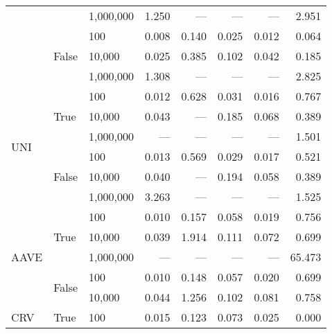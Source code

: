 \begin{tabular}{lllrrrrr}
                          &                        & 1,000,000       & 1.250   & ---    & ---   & ---   & 2.951   \\
    \cline{2-8}
                          & \multirow{3}{*}{False} & 100             & 0.008   & 0.140  & 0.025 & 0.012 & 0.064   \\
                          &                        & 10,000          & 0.025   & 0.385  & 0.102 & 0.042 & 0.185   \\
                          &                        & 1,000,000       & 1.308   & ---    & ---   & ---   & 2.825   \\
    \cline{1-8}
    \cline{2-8}
    \multirow{6}{*}{UNI}  & \multirow{3}{*}{True}  & 100             & 0.012   & 0.628  & 0.031 & 0.016 & 0.767   \\
                          &                        & 10,000          & 0.043   & ---    & 0.185 & 0.068 & 0.389   \\
                          &                        & 1,000,000       & ---     & ---    & ---   & ---   & 1.501   \\
    \cline{2-8}
                          & \multirow{3}{*}{False} & 100             & 0.013   & 0.569  & 0.029 & 0.017 & 0.521   \\
                          &                        & 10,000          & 0.040   & ---    & 0.194 & 0.058 & 0.389   \\
                          &                        & 1,000,000       & 3.263   & ---    & ---   & ---   & 1.525   \\
    \cline{1-8}
    \cline{2-8}
    \multirow{5}{*}{AAVE} & \multirow{3}{*}{True}  & 100             & 0.010   & 0.157  & 0.058 & 0.019 & 0.756   \\
                          &                        & 10,000          & 0.039   & 1.914  & 0.111 & 0.072 & 0.699   \\
                          &                        & 1,000,000       & ---     & ---    & ---   & ---   & 65.473  \\
    \cline{2-8}
                          & \multirow{2}{*}{False} & 100             & 0.010   & 0.148  & 0.057 & 0.020 & 0.699   \\
                          &                        & 10,000          & 0.044   & 1.256  & 0.102 & 0.081 & 0.758   \\
    \cline{1-8}
    \cline{2-8}
    \multirow{5}{*}{CRV}  & \multirow{3}{*}{True}  & 100             & 0.015   & 0.123  & 0.073 & 0.025 & 0.000   \\

\end{tabular}
